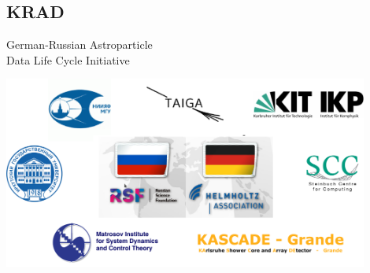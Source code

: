 \subsection{KRAD}

\begin{frame}{German-Russian Astroparticle \\Data Life Cycle Initiative\footnotemark[1]}
\vspace{-1.4em}
\begin{center}
  \includegraphics[width=0.9\textwidth]{pics/Collab-3.pdf}
\end{center}

\footnotesize{}
\end{frame}


